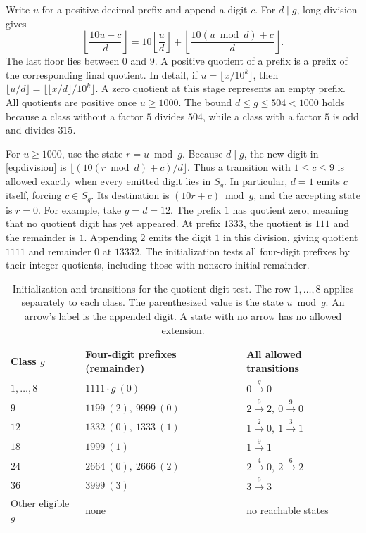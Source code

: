 \documentclass[11pt]{article}
\begin{document}
Write \(u\) for a positive decimal prefix and append a digit \(c\).
For \(d\mid g\), long division gives
\begin{equation}\label{eq:division}
 \left\lfloor\frac{10u+c}{d}\right\rfloor
 =10\left\lfloor\frac{u}{d}\right\rfloor
   +\left\lfloor\frac{10(u\bmod d)+c}{d}\right\rfloor .
\end{equation}
The last floor lies between \(0\) and \(9\). A positive quotient of a
prefix is a prefix of the corresponding final quotient. In detail, if
\(u=\lfloor x/10^k\rfloor\), then
\(\lfloor u/d\rfloor=\lfloor \lfloor x/d\rfloor/10^k\rfloor\).
A zero quotient at this stage represents an empty prefix. All quotients
are positive once \(u\ge1000\). The bound \(d\le g\le504<1000\)
holds because a class without a factor \(5\) divides \(504\), while
a class with a factor \(5\) is odd and divides \(315\).

For \(u\ge1000\), use the state \(r=u\bmod g\). Because \(d\mid g\),
the new digit in \eqref{eq:division} is
\(\lfloor(10(r\bmod d)+c)/d\rfloor\). Thus a transition with
\(1\le c\le9\) is allowed exactly when every emitted digit lies in \(S_g\). In particular,
\(d=1\) emits \(c\) itself, forcing \(c\in S_g\). Its destination is
\((10r+c)\bmod g\), and the accepting state is \(r=0\).
For example, take \(g=d=12\). The prefix \(1\) has quotient zero,
meaning that no quotient digit has yet appeared. At prefix \(1333\),
the quotient is \(111\) and the remainder is \(1\). Appending \(2\)
emits the digit \(1\) in this division, giving quotient \(1111\) and
remainder \(0\) at \(13332\). The initialization tests all four-digit
prefixes by their integer quotients, including those with nonzero
initial remainder.

\begin{table}[htbp]
\centering
\small
\begin{tabular}{@{}lll@{}}
\toprule
Class \(g\) & Four-digit prefixes (remainder) & All allowed transitions\\
\midrule
\(1,\ldots,8\) & \(1111\cdot g\ (0)\) & \(0\xrightarrow{g}0\)\\
\(9\) & \(1199\ (2),\ 9999\ (0)\) & \(2\xrightarrow{9}2,\ 0\xrightarrow{9}0\)\\
\(12\) & \(1332\ (0),\ 1333\ (1)\) & \(1\xrightarrow{2}0,\ 1\xrightarrow{3}1\)\\
\(18\) & \(1999\ (1)\) & \(1\xrightarrow{9}1\)\\
\(24\) & \(2664\ (0),\ 2666\ (2)\) & \(2\xrightarrow{4}0,\ 2\xrightarrow{6}2\)\\
\(36\) & \(3999\ (3)\) & \(3\xrightarrow{9}3\)\\
Other eligible \(g\) & none & no reachable states\\
\bottomrule
\end{tabular}
\caption{Initialization and transitions for the quotient-digit test.
The row \(1,\ldots,8\) applies separately to each class. The parenthesized value is the
state \(u\bmod g\). An arrow's label is the appended digit. A state
with no arrow has no allowed extension.}
\label{tab:states}
\end{table}
\end{document}
